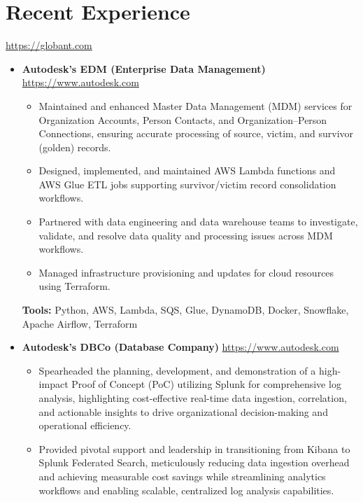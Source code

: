 \documentclass[11pt,a4paper,english]{moderncv}
\begin{document}
\maketitle

\section{Recent Experience}

{
\url{https://globant.com}
\newline{}
\begin{itemize}
  \item \textbf{Autodesk's EDM (Enterprise Data Management)}
        \newline{}
        \url{https://www.autodesk.com}
        \begin{itemize}
            \item Maintained and enhanced Master Data Management (MDM) services for Organization Accounts, Person Contacts, and Organization–Person Connections, ensuring accurate processing of source, victim, and survivor (golden) records.
            \item Designed, implemented, and maintained AWS Lambda functions and AWS Glue ETL jobs supporting survivor/victim record consolidation workflows.
            \item Partnered with data engineering and data warehouse teams to investigate, validate, and resolve data quality and processing issues across MDM workflows.
            \item Managed infrastructure provisioning and updates for cloud resources using Terraform.
        \end{itemize}
        \textbf{Tools:} Python, AWS, Lambda, SQS, Glue, DynamoDB, Docker, Snowflake, Apache Airflow, Terraform
  \item \textbf{Autodesk's DBCo (Database Company)}
        \newline{}
        \url{https://www.autodesk.com}
        \begin{itemize}
            \item Spearheaded the planning, development, and demonstration of a high-impact Proof of Concept (PoC) utilizing Splunk for comprehensive log analysis, highlighting cost-effective real-time data ingestion, correlation, and actionable insights to drive organizational decision-making and operational efficiency.
            \item Provided pivotal support and leadership in transitioning from Kibana to Splunk Federated Search, meticulously reducing data ingestion overhead and achieving measurable cost savings while streamlining analytics workflows and enabling scalable, centralized log analysis capabilities.

\end{itemize}
\end{itemize}}
\end{document}
